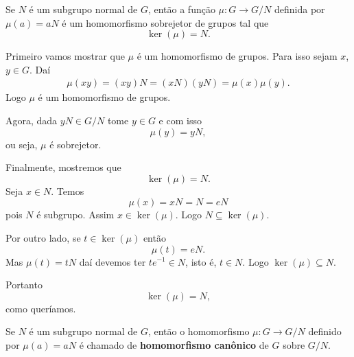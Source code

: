 \begin{proposicao}
    Se $N$ é um subgrupo normal de $G$, então a função $\mu : G \to G/N$ definida por $\mu(a) = aN$ é um homomorfismo sobrejetor de grupos tal que
    \[
        \ker(\mu) = N.
    \]
\end{proposicao}
\begin{prova}
    Primeiro vamos mostrar que $\mu$ é um homomorfismo de grupos. Para isso sejam $x$, $y \in G$. Daí
    \begin{align*}
        \mu(xy) = (xy)N = (xN)(yN) = \mu(x)\mu(y).
    \end{align*}
    Logo $\mu$ é um homomorfismo de grupos.

    Agora, dada $yN \in G/N$ tome $y \in G$ e com isso
    \[
        \mu(y) = yN,
    \]
    ou seja, $\mu$ é sobrejetor.

    Finalmente, mostremos que
    \[
        \ker(\mu) = N.
    \]
    Seja $x \in N$. Temos
    \[
        \mu(x) = xN = N = eN
    \]
    pois $N$ é subgrupo. Assim $x \in \ker(\mu)$. Logo $N \subseteq \ker(\mu)$.

    Por outro lado, se $t \in \ker(\mu)$ então
    \[
        \mu(t) = eN.
    \]
    Mas $\mu(t) = tN$ daí devemos ter $te^{-1} \in N$, isto é, $t \in N$. Logo $\ker(\mu) \subseteq N$.

    Portanto
    \[
        \ker(\mu) = N,
    \]
    como queríamos.
\end{prova}

\begin{definicao}
    Se $N$ é um subgrupo normal de $G$, então o homomorfismo $\mu : G \to G/N$ definido por $\mu(a) = aN$ é chamado de \textbf{homomorfismo can\^onico} de $G$ sobre $G/N$.
\end{definicao}

